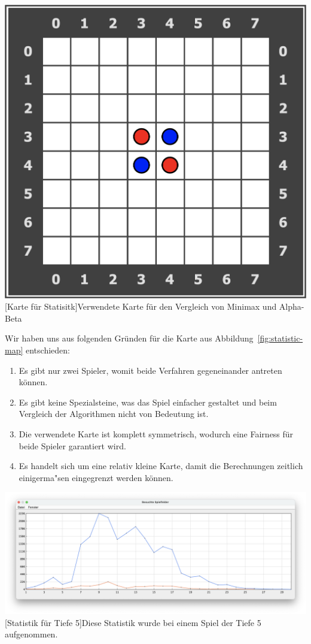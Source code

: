 \vspace{1em}
\begin{minipage}{\linewidth}
    \centering
    \includegraphics[width=0.3\linewidth]{pics/statistic-map}
    [Karte für Statisitk]{Verwendete Karte für den Vergleich von Minimax und Alpha-Beta}
    \label{fig:statistic-map}
\end{minipage}
\vspace{1em}

Wir haben uns aus folgenden Gr\"unden f\"ur die Karte aus Abbildung~\ref{fig:statistic-map} entschieden:
\begin{enumerate}
    \item Es gibt nur zwei Spieler, womit beide Verfahren gegeneinander antreten k\"onnen.
    \item Es gibt keine Spezialsteine, was das Spiel einfacher gestaltet und beim Vergleich der Algorithmen nicht von Bedeutung ist.
    \item Die verwendete Karte ist komplett symmetrisch, wodurch eine Fairness f\"ur beide Spieler garantiert wird.
    \item Es handelt sich um eine relativ kleine Karte, damit die Berechnungen zeitlich einigerma"sen eingegrenzt werden k\"onnen.
\end{enumerate}

\vspace{1em}
\begin{minipage}{\linewidth}
    \centering
    \includegraphics[width=0.9\linewidth]{statistic/Test-D5-01/ST-01-D5-LD}
    [Statistik für Tiefe 5]{Diese Statistik wurde bei einem Spiel der Tiefe 5 aufgenommen.}
    \label{fig:statistic-screen}
\end{minipage}
\vspace{1em}

